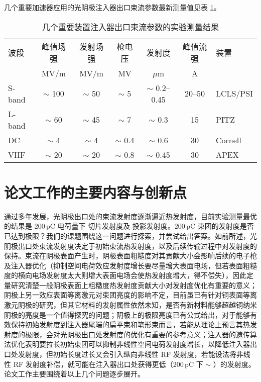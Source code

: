 几个重要加速器应用的光阴极注入器出口束流参数最新测量值\cite{Zhou:2015aa,Krasilnikov:2012aa,prat2014emittance,Bartnik:2015aa}见表 \ref{tab:record-emit}。
\begin{table}[htbp]
\caption{几个重要装置注入器出口束流参数的实验测量结果}
\label{tab:record-emit}
\centering
\begin{tabular}{lcccccl}
\toprule
波段 & 峰值场强 & 发射场强 & 枪电压 & 发射度 & 峰值流强 & 装置 \\
 & MV/m & MV/m & MV & $\mu$m & A & \\
\midrule
S-band & $\sim$ 100 & $\sim$ 50 & $\sim$ 5 & $\sim$ 0.2--0.45 & 20--50 & LCLS/PSI \\
L-band & $\sim$ 60 & $\sim$ 45 & $\sim$ 7 & $\sim$ 0.3 & 15 & PITZ \\
DC & $\sim$ 4 & $\sim$ 4 & $\sim$ 0.4 & $\sim$ 0.6 & 30 & Cornell \\
VHF & $\sim$ 20 & $\sim$ 20 & $\sim$ 0.8 & $\sim$ 0.45 & 30 & APEX \\
\bottomrule
\end{tabular}
\end{table}

\section{论文工作的主要内容与创新点}
通过多年发展，光阴极出口处的束流发射度逐渐逼近热发射度，目前实验测量最优的结果是 200\,pC 电荷量下  切片发射度及  投影发射度\cite{Bettoni:2016aa}。200\,pC 束团的发射度是否已达到极限？我们的课题围绕这一问题进行探索，并尝试给出答案。如前所述，光阴极出口处束流发射度决定于初始束流热发射度，以及后续传输过程中对发射度的保持。束流在阴极表面产生时，阴极表面粗糙度对其贡献大小会影响后续的电子枪及注入器优化（抑制空间电荷效应发射度增长要尽量增大表面电场，但若表面粗糙度的横向电场发射度太大则增大表面电场会使热发射度增大，得不偿失），因此定量研究清楚一般阴极表面上粗糙度热发射度贡献大小对发射度优化有重要的意义；阴极上另一效应表面等离激元对束团亮度的影响不定，目前虽已有针对铜表面等离激元阴极的研究，但其它材料的发射属性依然未知，是否有新材料能够超越铜纳米阴极的亮度是一个值得探究的问题；阴极上的极限亮度已有公式给出，对于能够有效保持初始发射度到注入器尾端的扁平束和笔形束而言，若能从理论上预言其热发射度的极限，会对光阴极出口处发射度的优化有重要的参考意义；注入器的遗传算法优化表明要拉长初始束团可以抑制非线性空间电荷发射度增长，以降低注入器出口处发射度，但初始长度过长又会引入纵向非线性 RF 发射度，若能设法将非线性 RF 发射度补偿，就可能在注入器出口处获得更低（200\,pC 下 $\sim$ ）的发射度。论文工作主要围绕着以上几个问题逐步展开。

